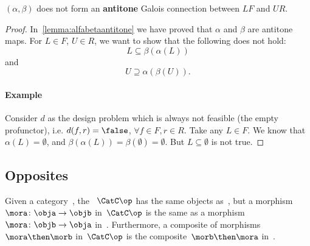 

\begin{lemma}
    $(\alpha, \beta)$ does not form an \textbf{antitone} Galois connection between $LF$ and $UR$.
\end{lemma}
\begin{proof}
    In~\cref{lemma:alfabetaantitone} we have proved that $\alpha$ and $\beta$ are antitone maps. For $L\in F$, $U\in R$, we want to show that the following does not hold:
    \begin{equation}
        \label{eq:alfabetafirst}
        L\subseteq \beta(\alpha(L))
    \end{equation}
    and
    \begin{equation}
        \label{eq:alfabetasec}
        U\supseteq \alpha(\beta(U)).
    \end{equation}

    \paragraph{Example} Consider $d$ as the design problem which is always not feasible (the empty profunctor), i.e. $d(f,r)=\false$, $\forall f\in F,r\in R$. Take any $L\in F$. We know that $\alpha(L)=\emptyset$, and $\beta(\alpha(L))=\beta(\emptyset)=\emptyset$. But $L\subseteq \emptyset$ is not true.

\end{proof}

\subsection{Opposites}

\begin{ctdefinition}
    \label{def:oppositecat}
    Given a category~\CatC, the \emph{}~$\CatC\op$ has the same objects as~\CatC, but a morphism~$\mora\colon \obja\to \objb$ in~$\CatC\op$ is the same as a morphism~$\mora\colon \objb\to \obja$ in~\CatC. Furthermore, a composite of morphisms~$\mora \then \morb$ in~$\CatC\op$ is the composite~$\morb\then \mora$ in~\CatC.
\end{ctdefinition}

